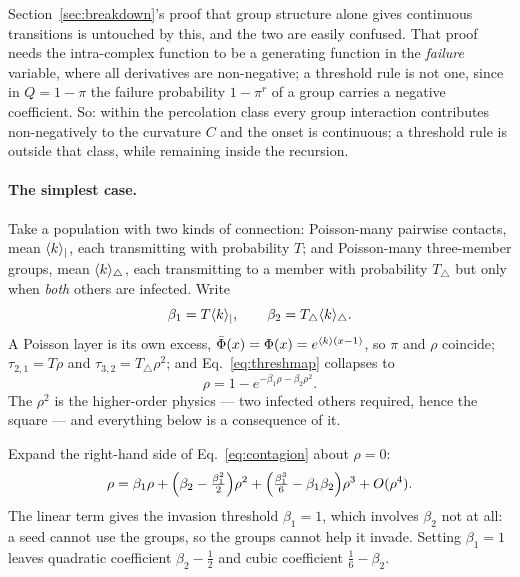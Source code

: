 Section~\ref{sec:breakdown}'s proof that group structure alone gives continuous
transitions is untouched by this, and the two are easily confused. That proof
needs the intra-complex function to be a generating function in the
\emph{failure} variable, where all derivatives are non-negative; a threshold
rule is not one, since in $Q=1-\pi$ the failure probability $1-\pi^{r}$ of a
group carries a negative coefficient. So: within the percolation class every
group interaction contributes non-negatively to the curvature $C$ and the onset
is continuous; a threshold rule is outside that class, while remaining inside
the recursion.

\paragraph{The simplest case.} Take a population with two kinds of connection:
Poisson-many pairwise contacts, mean $\langle k \rangle_{|}$, each transmitting with
probability $T$; and Poisson-many three-member groups, mean
$\langle k \rangle_{\triangle}$, each transmitting to a member with probability
$T_{\triangle}$ but only when \emph{both} others are infected. Write
\begin{equation}
  \beta_{1}=T\langle k \rangle_{|},
  \qquad
  \beta_{2}=T_{\triangle}\langle k \rangle_{\triangle}.
\end{equation}
A Poisson layer is its own excess, $\bar\Phi(x)=\Phi(x)=e^{\langle k \rangle(x-1)}$, so
$\pi$ and $\rho$ coincide; $\tau_{2,1}=T\rho$ and $\tau_{3,2}=T_{\triangle}\rho^{2}$;
and Eq.~\eqref{eq:threshmap} collapses to
\begin{equation}
  \rho=1-e^{-\beta_{1}\rho-\beta_{2}\rho^{2}}.
  \label{eq:contagion}
\end{equation}
The $\rho^{2}$ is the higher-order physics --- two infected others
required, hence the square --- and everything below is a consequence of it.

Expand the right-hand side of Eq.~\eqref{eq:contagion} about $\rho=0$:
\[
  \rho=\beta_{1}\rho
      +\Bigl(\beta_{2}-\tfrac{\beta_{1}^{2}}{2}\Bigr)\rho^{2}
      +\Bigl(\tfrac{\beta_{1}^{3}}{6}-\beta_{1}\beta_{2}\Bigr)\rho^{3}
      +O(\rho^{4}).
\]
The linear term gives the invasion threshold $\beta_{1}=1$, which involves
$\beta_{2}$ not at all: a seed cannot use the groups, so the groups cannot help
it invade. Setting $\beta_{1}=1$ leaves quadratic coefficient
$\beta_{2}-\tfrac12$ and cubic coefficient $\tfrac16-\beta_{2}$.

